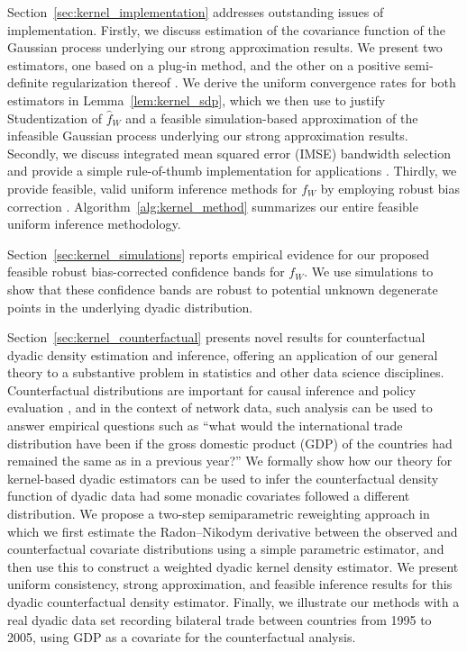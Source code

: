 \documentclass[11pt,lof]{puthesis}
\theoremstyle{break}
\theoremstyle{proof}
\begin{document}
Section~\ref{sec:kernel_implementation} addresses outstanding issues of
implementation. Firstly, we discuss estimation of the covariance function of
the Gaussian process underlying our strong approximation results. We present
two estimators, one based on a plug-in method, and the other on a
positive semi-definite regularization thereof \citep{laurent2005semidefinite}.
We derive the uniform convergence rates for both estimators in
Lemma~\ref{lem:kernel_sdp}, which we then use to justify Studentization
of $\hat{f}_W$
and a feasible simulation-based approximation of the infeasible Gaussian
process underlying our strong approximation results. Secondly, we discuss
integrated mean squared error (IMSE) bandwidth selection and provide a simple
rule-of-thumb implementation for applications
\citep{wand1994kernel,simonoff1996smoothing}. Thirdly, we provide feasible,
valid uniform inference methods for $f_W$ by employing robust bias correction
\citep{calonico2018effect, calonico2022coverage}.
Algorithm~\ref{alg:kernel_method}
summarizes our entire feasible uniform inference methodology.

Section~\ref{sec:kernel_simulations} reports empirical evidence for our proposed
feasible robust bias-corrected confidence bands for $f_W$. We use simulations
to show that these confidence bands are robust to potential unknown degenerate
points in the underlying dyadic distribution.

Section~\ref{sec:kernel_counterfactual} presents novel results for
counterfactual
dyadic density estimation and inference, offering an application of our general
theory to a substantive problem in statistics and other data science
disciplines. Counterfactual distributions are important for causal inference
and policy evaluation
\citep{dinardo1996distribution,chernozhukov2013inference}, and in the context
of network data, such analysis can be used to answer empirical questions such
as ``what would the international trade distribution have been if
the gross domestic product (GDP) of the countries had remained the same as in a
previous year?'' We formally show how our theory for kernel-based dyadic
estimators can be used to infer the counterfactual density function of dyadic
data had some monadic covariates followed a different distribution. We propose
a two-step semiparametric reweighting approach in which we first estimate the
Radon--Nikodym derivative between the observed and counterfactual covariate
distributions using a simple parametric estimator, and then use this to
construct a weighted dyadic kernel density estimator. We present uniform
consistency, strong approximation, and feasible inference results for this
dyadic counterfactual density estimator. Finally, we illustrate our
methods with a real dyadic data set recording bilateral trade between
countries from 1995 to 2005, using GDP as a covariate for the
counterfactual analysis.
\end{document}
